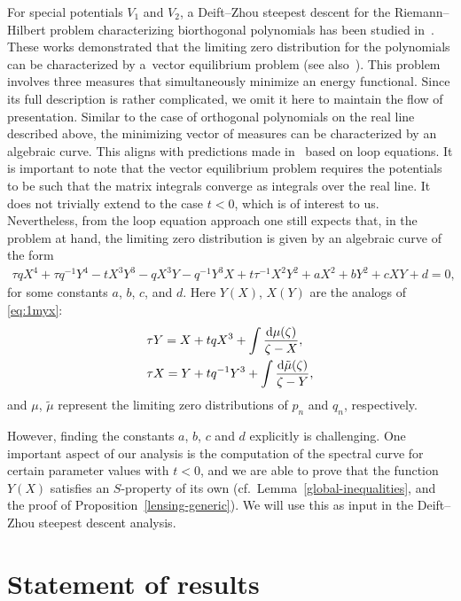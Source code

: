 \documentclass[10pt,a4paper]{amsart}
\numberwithin{equation}{section}
\begin{document}
For special potentials $V_1$ and $V_2$, a Deift--Zhou steepest descent for the Riemann--Hilbert problem characterizing biorthogonal polynomials has been studied in~\cite{DG, DK1,DKM}. These works demonstrated that the limiting zero distribution for the polynomials can be characterized by a~vector equilibrium problem (see also~\cite{DGK}). This problem involves three measures that simultaneously minimize an energy functional. Since its full description is rather complicated, we omit it here to maintain the flow of presentation. Similar to the case of orthogonal polynomials on the real line described above, the minimizing vector of measures can be characterized by an algebraic curve. This aligns with predictions made in~\cite{Eynard,Orantin} based on loop equations. It is important to note that the vector equilibrium problem requires the potentials to be such that the matrix integrals converge as integrals over the real line. It does not trivially extend to the case $t<0$, which is of interest to us. Nevertheless, from the loop equation approach one still expects that, in the problem at hand, the limiting zero distribution is given by an algebraic curve of the form
\begin{align*}
 \tau q X^4 + \tau q^{-1}Y^4 -tX^3Y^3 - qX^3Y - q^{-1}Y^3X + t\tau^{-1}X^2Y^2
 + a X^2 + b Y^2 + c XY + d=0,
\end{align*}
for some constants $a$, $b$, $c$, and $d$. Here $Y(X)$, $X(Y)$ are the analogs of \eqref{eq:1myx}:
 \begin{align*} %
& \tau Y=X + t q X^3 + \int \frac{{\rm d}\mu(\zeta)}{\zeta - X},\\
& \tau X=Y + t q^{-1} Y^3 + \int \frac{{\rm d}\tilde \mu(\zeta)}{\zeta - Y},
 \end{align*}
and $\mu$, $\tilde{\mu}$ represent the limiting zero distributions of $p_n$ and $q_n$, respectively.

 However, finding the constants $a$, $b$, $c$ and $d$ explicitly is challenging. One important aspect of our analysis is the computation of the spectral curve for certain parameter values with $t<0$, and we are able to prove that the function $Y(X)$ satisfies an $S$-property of its own (cf.\ Lemma~\ref{global-inequalities}, and the proof of Proposition~\ref{lensing-generic}).
We will use this as input in the Deift--Zhou steepest descent analysis.

\section{Statement of results}
\end{document}

